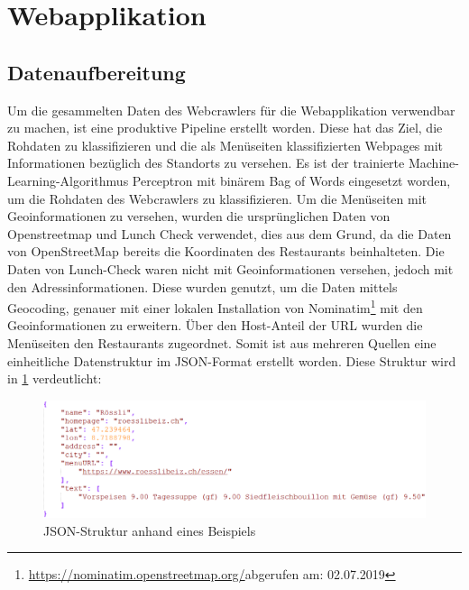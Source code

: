 \section{Webapplikation}
\subsection{Datenaufbereitung}
Um die gesammelten Daten des Webcrawlers für die Webapplikation verwendbar zu machen, ist eine produktive Pipeline erstellt worden.
Diese hat das Ziel, die Rohdaten zu klassifizieren und die als Menüseiten klassifizierten Webpages mit Informationen bezüglich des Standorts zu versehen.
Es ist der trainierte Machine-Learning-Algorithmus \glqq Perceptron mit binärem Bag of Words\grqq{} eingesetzt worden, um die Rohdaten des Webcrawlers zu klassifizieren.
Um die Menüseiten mit Geoinformationen zu versehen, wurden die ursprünglichen Daten von Openstreetmap und Lunch Check verwendet, dies aus dem Grund, da die Daten von OpenStreetMap bereits die Koordinaten des Restaurants beinhalteten.
Die Daten von Lunch-Check waren nicht mit Geoinformationen versehen, jedoch mit den Adressinformationen.
Diese wurden genutzt, um  die Daten mittels Geocoding, genauer mit einer lokalen Installation von Nominatim\footnote{\url{https://nominatim.openstreetmap.org/}abgerufen am: 02.07.2019} mit den Geoinformationen zu erweitern.
Über den Host-Anteil der URL wurden die Menüseiten den Restaurants zugeordnet.
Somit ist aus mehreren Quellen eine einheitliche Datenstruktur im JSON-Format erstellt worden.
Diese Struktur wird in \cref{fig:json_struktur} verdeutlicht:
\begin{figure}[H]	
	\includegraphics[width=1\columnwidth,keepaspectratio]{img/json_struktur.png}
	\caption{JSON-Struktur anhand eines Beispiels}
	\label{fig:json_struktur}
\end{figure}
